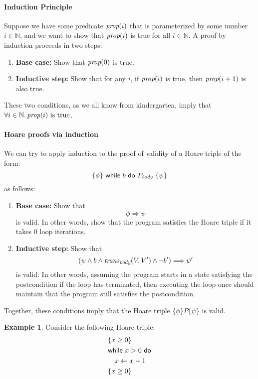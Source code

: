 \documentclass{amsart}
\theoremstyle{definition}
\newtheorem{example}[theorem]{Example}
\theoremstyle{remark}
\numberwithin{equation}{section}
\begin{document}
\paragraph{Induction Principle}
Suppose we have some predicate $\emph{prop}(i)$
that is parameterized by some number $i \in \mathbb{N}$,
and we want to show that $\emph{prop}(i)$ is true
for all $i \in \mathbb{N}$.
A proof by induction proceeds in two steps:
\begin{enumerate}
  \item \textbf{Base case:}
  Show that $\emph{prop}(0)$ is true.

  \item \textbf{Inductive step:}
  Show that for any $i$,
  if $\emph{prop}(i)$ is true, then $\emph{prop}(i+1)$
  is also true.
\end{enumerate}
These two conditions, as we all know from kindergarten,
imply that $\forall i \in \mathbb{N} \ldotp \emph{prop}(i) \text{ is true}$.

\paragraph{Hoare proofs via induction}
We can try to apply induction to the proof
of validity of a Hoare triple of the form:
$$\{\phi\}\ \whilest\  b\  \dost\  P_\body\  \{\psi\}$$
as follows:
\begin{enumerate}
  \item \textbf{Base case:}
  Show that
  $$\phi \Rightarrow \psi$$
  is valid.
  In other words, show that the program satisfies
  the Hoare triple if it takes 0 loop iterations.

  \item \textbf{Inductive step:}
  Show that
  $$(\psi \land b \land \mathit{trans}_{\emph{body}}(V,V') \land
  \neg b') \Longrightarrow  \psi'$$
  is valid.
  In other words, assuming the program starts
  in a state satisfying the postcondition if the loop has terminated,
  then executing the loop once should maintain
  that the program still satisfies the postcondition.
\end{enumerate}
Together, these conditions imply that
the Hoare triple $\{\phi\} P \{\psi\}$
is valid.

\begin{example}
  Consider the following Hoare triple:
  \begin{align*}
    &\{x \geq 0\} \\
    &\mathsf{while} ~ x > 0  ~ \mathsf{do}\\
    &\ \ \ x \gets x - 1\\
    &\{x \geq 0\}
  \end{align*}
\end{example}
\end{document}
